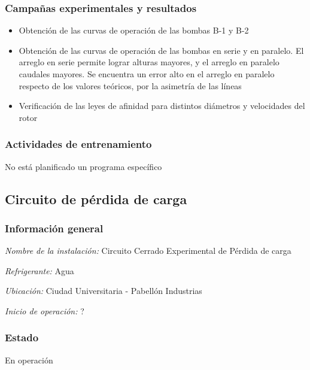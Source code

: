 \documentclass{article}
\begin{document}
\subsubsection*{Campañas experimentales y resultados}
\begin{itemize}
    \item Obtención de las curvas de operación de las bombas B-1 y B-2
    \item Obtención de las curvas de operación de las bombas en serie y en paralelo. El arreglo en serie permite lograr alturas mayores, y el arreglo en paralelo caudales mayores. Se encuentra un error alto en el arreglo en paralelo respecto de los valores teóricos, por la asimetría de las líneas
    \item Verificación de las leyes de afinidad para distintos diámetros y velocidades del rotor
\end{itemize}

\subsubsection*{Actividades de entrenamiento}
No está planificado un programa específico
\subsection{Circuito de pérdida de carga}
\subsubsection*{Información general}
\textit{Nombre de la instalación: }Circuito Cerrado Experimental de Pérdida de carga

\textit{Refrigerante: }Agua

\textit{Ubicación: }Ciudad Universitaria - Pabellón Industrias

\textit{Inicio de operación: }?

\subsubsection*{Estado}
En operación
\end{document}

